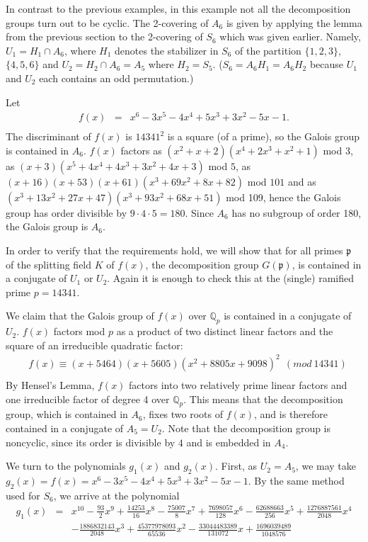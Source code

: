 \documentclass[reqno,12pt]{amsart}
\theoremstyle{remark}
\theoremstyle{definition}
\theoremstyle{citing}
\numberwithin{theorem}{section}
\numberwithin{equation}{section}
\begin{document}
In contrast to the previous examples, in this example not all the decomposition
groups turn out to be cyclic.
The 2-covering of $A_{6}$ is given by applying the lemma
from the previous section to the 2-covering of $S_{6}$ which was
given  earlier.  Namely, $U_{1}=H_{1}\cap A_{6}$, where
$H_{1}$ denotes the stabilizer in $S_{6}$ of the partition $\{1,2,3\}$,
$\{4,5,6\}$ and $U_{2}=H_{2}\cap A_{6}=A_{5}$ where $H_{2}=S_{5}$.
($S_{6}=A_{6}H_{1}=A_{6}H_{2}$ because $U_{1}$
and $U_{2}$ each contains an odd permutation.)

 Let \begin{eqnarray*}
f(x) & = & x^{6}-3x^{5}-4x^{4}+5x^{3}+3x^{2}-5x-1.\\
\end{eqnarray*}
The discriminant
of $f(x)$ is $14341^{2}$  is a square (of a prime), so the Galois group is contained in $A_{6}$.
 $f(x)$ factors as $(x^{2}+x+2)(x^{4}+2x^{3}+x^{2}+1)$
 mod $3$, as $(x+3)(x^{5}+4x^{4}+4x^{3}+3x^{2}+4x+3)$
mod $5$,  as $(x+16)(x+53)(x+61)(x^{3}+69x^{2}+8x+82)$
 mod $101$ and as $(x^{3}+13x^{2}+27x+47)(x^{3}+93x^{2}+68x+51)$
mod 109, hence the Galois group has order divisible by $9\cdot4\cdot5=180$.
Since $A_{6}$ has no subgroup of order 180, the Galois group is $A_{6}$.

In order to verify that the requirements hold, we will show that for
all primes $\mathfrak{p}$ of the splitting field $K$ of $f(x)$, the decomposition group $G(\mathfrak{p})$,
is contained in a conjugate of $U_{1}$ or $U_{2}$. Again it is enough to check this at
the (single) ramified prime $p=14341$.

We claim that the Galois group of $f(x)$ over
$\mathbb{Q}_{p}$ is contained in a conjugate of $U_{2}$.  $f(x)$ factors mod $p$ as a product of two distinct linear
factors and the square of an irreducible quadratic factor:  \begin{eqnarray*}
 & f(x)\equiv(x+5464)(x+5605)(x^{2}+8805x+9098)^{2}\ \ (mod\ 14341)\\
\end{eqnarray*}
By Hensel's Lemma, $f(x)$ factors into two
relatively prime linear factors and one irreducible factor of degree
4 over $\mathbb{Q}_{p}$. This means that the decomposition group,
which is contained in $A_{6}$, fixes two roots of $f(x)$, and is therefore contained in a conjugate of $A_5=U_2$.  Note that the decomposition group is noncyclic, since its order is divisible by $4$ and is embedded in $A_4$.

We turn to the polynomials $g_{1}(x)$ and $g_{2}(x)$.  First, as $U_2=A_5$, we may take $g_{2}(x)=f(x)=x^{6}-3x^{5}-4x^{4}+5x^{3}+3x^{2}-5x-1$.  By  the same method used for $S_6$, we arrive at
the polynomial
\begin{eqnarray*}
g_{1}(x) & = & x^{10}-\frac{93}{2}x^{9}+\frac{14253}{16}x^{8}-\frac{75007}{8}x^{7}+\frac{7698057}{128}x^{6}-\frac{62688663}{256}x^{5}+\frac{1276887561}{2048}x^{4}\\
 &  & -\frac{1886832143}{2048}x^{3}+\frac{45377978093}{65536}x^{2}-\frac{33044483389}{131072}x+\frac{1696039489}{1048576}\end{eqnarray*}
\end{document}
